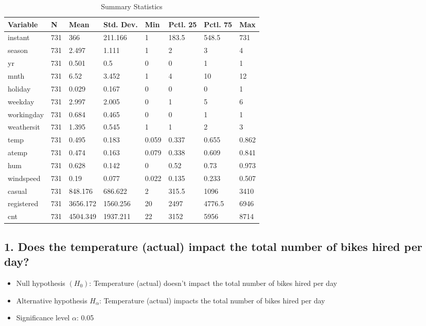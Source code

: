 \documentclass[
]{article}
\providecommand{\tightlist}{%
  \setlength{\itemsep}{0pt}\setlength{\parskip}{0pt}}
\begin{document}
\begin{table}

\caption{\label{tab:unnamed-chunk-4}Summary Statistics}
\centering
\begin{tabular}[t]{llllllll}
\toprule
Variable & N & Mean & Std. Dev. & Min & Pctl. 25 & Pctl. 75 & Max\\
\midrule
instant & 731 & 366 & 211.166 & 1 & 183.5 & 548.5 & 731\\
season & 731 & 2.497 & 1.111 & 1 & 2 & 3 & 4\\
yr & 731 & 0.501 & 0.5 & 0 & 0 & 1 & 1\\
mnth & 731 & 6.52 & 3.452 & 1 & 4 & 10 & 12\\
holiday & 731 & 0.029 & 0.167 & 0 & 0 & 0 & 1\\
\addlinespace
weekday & 731 & 2.997 & 2.005 & 0 & 1 & 5 & 6\\
workingday & 731 & 0.684 & 0.465 & 0 & 0 & 1 & 1\\
weathersit & 731 & 1.395 & 0.545 & 1 & 1 & 2 & 3\\
temp & 731 & 0.495 & 0.183 & 0.059 & 0.337 & 0.655 & 0.862\\
atemp & 731 & 0.474 & 0.163 & 0.079 & 0.338 & 0.609 & 0.841\\
\addlinespace
hum & 731 & 0.628 & 0.142 & 0 & 0.52 & 0.73 & 0.973\\
windspeed & 731 & 0.19 & 0.077 & 0.022 & 0.135 & 0.233 & 0.507\\
casual & 731 & 848.176 & 686.622 & 2 & 315.5 & 1096 & 3410\\
registered & 731 & 3656.172 & 1560.256 & 20 & 2497 & 4776.5 & 6946\\
cnt & 731 & 4504.349 & 1937.211 & 22 & 3152 & 5956 & 8714\\
\bottomrule
\end{tabular}
\end{table}

\hypertarget{does-the-temperature-actual-impact-the-total-number-of-bikes-hired-per-day}{%
\subsection{1. Does the temperature (actual) impact the total number of
bikes hired per
day?}\label{does-the-temperature-actual-impact-the-total-number-of-bikes-hired-per-day}}

\begin{itemize}
\tightlist
\item
  Null hypothesis \((H_0)\): Temperature (actual) doesn't impact the
  total number of bikes hired per day\\
\item
  Alternative hypothesis \(H_\alpha\): Temperature (actual) impacts the
  total number of bikes hired per day\\
\item
  Significance level \(\alpha\): 0.05
\end{itemize}
\end{document}
